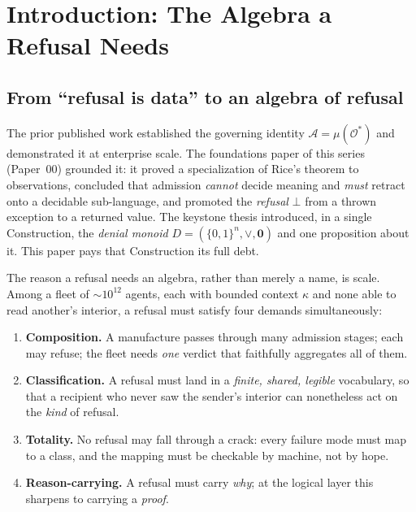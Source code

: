 \documentclass[11pt,oneside]{book}
\theoremstyle{definition}
\theoremstyle{plain}
\theoremstyle{remark}
\newcommand{\Adm}{\mathcal{O}^{*}}             %
\newcommand{\Act}{\mathcal{A}}                 %
\newcommand{\muop}{\mu}                        %
\newcommand{\Rfsl}{\bot}                        %
\newcommand{\CL}{\kappa}                       %
\begin{document}
\tableofcontents

\mainmatter

\chapter{Introduction: The Algebra a Refusal Needs}
\label{ch:intro}

\section{From ``refusal is data'' to an algebra of refusal}

The prior published work \cite{chatman2025} established the governing identity $\Act=\muop(\Adm)$ and demonstrated it at enterprise scale. %
The foundations paper of this series (Paper~00) grounded it: it proved a specialization of Rice's theorem \cite{rice1953} to observations, concluded that admission \emph{cannot} decide meaning and \emph{must} retract onto a decidable sub-language, and promoted the \emph{refusal} $\Rfsl$ from a thrown exception to a returned value. %
The keystone thesis introduced, in a single Construction, the \emph{denial monoid} $D=(\{0,1\}^{n},\lor,\bm 0)$ and one proposition about it. %
This paper pays that Construction its full debt. %

The reason a refusal needs an algebra, rather than merely a name, is scale. %
Among a fleet of $\sim\!10^{12}$ agents, each with bounded context $\CL$ and none able to read another's interior, a refusal must satisfy four demands simultaneously: %

\begin{enumerate}[label=(D\arabic*),leftmargin=*]
\item \textbf{Composition.} A manufacture passes through many admission stages; each may refuse; the fleet needs \emph{one} verdict that faithfully aggregates all of them. %
\item \textbf{Classification.} A refusal must land in a \emph{finite, shared, legible} vocabulary, so that a recipient who never saw the sender's interior can nonetheless act on the \emph{kind} of refusal. %
\item \textbf{Totality.} No refusal may fall through a crack: every failure mode must map to a class, and the mapping must be checkable by machine, not by hope. %
\item \textbf{Reason-carrying.} A refusal must carry \emph{why}; at the logical layer this sharpens to carrying a \emph{proof}. %
\end{enumerate}
\end{document}
